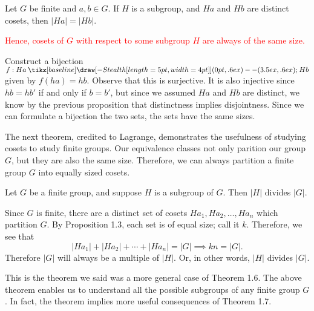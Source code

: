\documentclass[12pt,letterpaper]{algebra_book}
\renewcommand{\to}{\mathbin{\tikz[baseline] \draw[-{Stealth[length=5pt,width=4pt]}] (0pt,.6ex) -- (3.5ex,.6ex);}}
\theoremstyle{definition}
\begin{document}
    \begin{proposition}
        Let $G$ be finite and $a, b \in G$. If $H$ is a subgroup, and 
        $Ha$ and $Hb$ are distinct cosets, then $|Ha| = |Hb|$.
    \end{proposition}
        \textcolor{red}{Hence, cosets of $G$ with respect to some
        subgroup $H$ are always of the same size.}
    \begin{prf}
        Construct a bijection $f: Ha \to Hb$ given by $f(ha) = hb$.
        Observe that this is surjective. It is also injective since
        $hb = hb'$ 
        if and only if $b = b'$, but since we assumed $Ha$ and $Hb$
        are distinct, we know by the previous proposition that
        distinctness implies disjointness. Since we can formulate a bijection
        the two sets, the sets have the same sizes.
    \end{prf}

    The next theorem, credited to Lagrange, demonstrates the
    usefulness of studying cosets to study finite groups. Our
    equivalence classes not only parition our group $G$, but they are
    also the same size. Therefore, we can always partition a finite group
    $G$ into equally sized cosets. 

    \begin{thm}
        Let $G$ be a finite group, and suppose $H$ is a subgroup of
        $G$. Then $|H|$ divides $|G|$.
    \end{thm}

    \begin{prf}
        Since $G$ is finite, there are a distinct set of cosets $Ha_1,
        Ha_2, \dots , Ha_n$ which partition $G$. By Proposition 1.3,
        each set is of equal size; call it $k$. Therefore, we see that 
        \[
            |Ha_1| + |Ha_2| + \cdots + |Ha_n| = |G|
            \implies kn = |G|.
        \]
        Therefore $|G|$ will always be a multiple of $|H|$. Or, in
        other words, $|H|$ divides $|G|$.
    \end{prf}
    
    This is the theorem we said was a more general case of Theorem
    1.6. 
    The above theorem enables us to understand all the possible
    subgroups of any finite group $G$. In fact, the theorem implies
    more useful consequences of Theorem 1.7.
\end{document}
